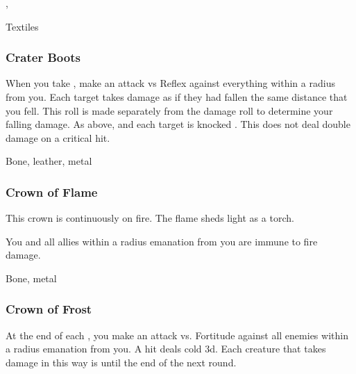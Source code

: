  , 


 Textiles


\lowercase{\hypertarget{item:Crater Boots}{}}\label{item:Crater Boots}
\hypertarget{item:Crater Boots}{\subsubsection{Crater Boots\hfill{}}}

When you take , make an attack vs Reflex against everything within a \areasmall radius from you.
\hit Each target takes damage as if they had fallen the same distance that you fell.
This roll is made separately from the damage roll to determine your falling damage.
\crit As above, and each target is knocked .
This does not deal double damage on a critical hit.



 Bone, leather, metal


\lowercase{\hypertarget{item:Crown of Flame}{}}\label{item:Crown of Flame}
\hypertarget{item:Crown of Flame}{\subsubsection{Crown of Flame\hfill{}}}

This crown is continuously on fire.
The flame sheds light as a torch.

You and all allies within a \arealarge radius emanation from you are immune to fire damage.



 


 Bone, metal


\lowercase{\hypertarget{item:Crown of Frost}{}}\label{item:Crown of Frost}
\hypertarget{item:Crown of Frost}{\subsubsection{Crown of Frost\hfill{}}}

At the end of each , you make an attack vs. Fortitude against all enemies within a \areamed radius emanation from you.
A hit deals cold  \minus3d.
Each creature that takes damage in this way is \fatigued until the end of the next round.



